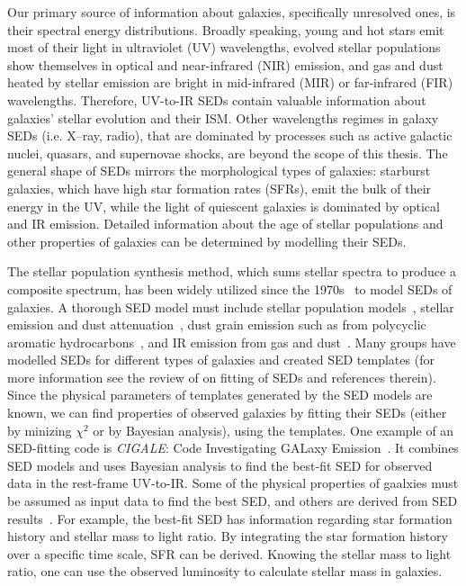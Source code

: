Our primary source of information about galaxies, specifically unresolved ones, is their spectral energy distributions. 
Broadly speaking, young and hot stars emit most of their light in ultraviolet (UV) wavelengths, evolved stellar populations show themselves in optical and near-infrared (NIR) emission, and gas and dust heated by stellar emission are bright in mid-infrared (MIR) or far-infrared (FIR) wavelengths.
Therefore, UV-to-IR SEDs contain valuable information about galaxies' stellar evolution and their ISM. 
Other wavelengths regimes in galaxy SEDs (i.e. X--ray, radio), that are dominated by processes such as active galactic nuclei, quasars, and supernovae shocks, are beyond the scope of this thesis.
The general shape of SEDs mirrors the morphological types of galaxies: starburst galaxies, which have high star formation rates (SFRs), emit the bulk of their energy in the UV, while the light of quiescent galaxies is dominated by optical and IR emission. 
Detailed information about the age of stellar populations and other properties of galaxies can be determined by modelling their SEDs.

The stellar population synthesis method, which sums stellar spectra to produce a composite spectrum, has been widely utilized since the 1970s~\citep[e.g.][]{Tinsley72,Searle73} to model SEDs of galaxies.
A thorough SED model must include stellar population models~\citep[e.g.][]{Bruzual93,Bruzual03,Maraston05}, stellar emission and dust attenuation~\citep[e.g.][]{Calzetti00,Dopita05}, dust grain emission such as from polycyclic aromatic hydrocarbons~\citep[PAHs; e.g.][and references therein]{Tielens08}, and IR emission from gas and dust~\citep[e.g.][]{Chary01,Dale02,Lagache03,Lagache04,Smith07a,Draine07}.
Many groups have modelled SEDs for different types of galaxies and created SED templates (for more information see the review of \cite{Walcher11} on fitting of SEDs and references therein).
Since the physical parameters of templates generated by the SED models are known, we can find properties of observed galaxies by fitting their SEDs (either by minizing $\chi^2$ or by Bayesian analysis),  using the templates.
One example of an SED-fitting code is {\em CIGALE}: Code Investigating GALaxy Emission~\citep{Noll09}.
It combines SED models and uses Bayesian analysis to find the best-fit SED for observed data in the rest-frame UV-to-IR.
Some of the physical properties of gaalxies must be assumed as input data to find the best SED, and others are derived from SED results~\citep[see ][for more detail]{Walch08}.
For example, the best-fit SED has information regarding star formation history and stellar mass to light ratio.
By integrating the star formation history over a specific time scale, SFR can be derived. %
Knowing the stellar mass to light ratio, one can use the observed luminosity to calculate stellar mass in galaxies.

